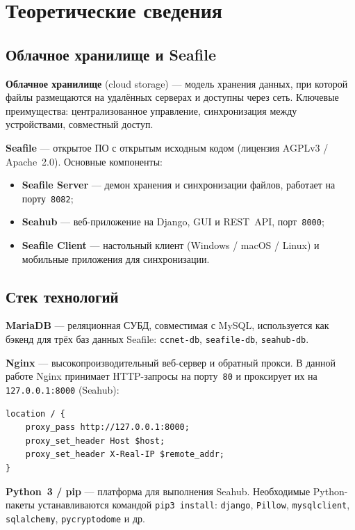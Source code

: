 \chapter{Теоретические сведения}
\label{ch:theory}

\section{Облачное хранилище и Seafile}

\textbf{Облачное хранилище} (cloud storage) — модель хранения данных, при которой
файлы размещаются на удалённых серверах и доступны через сеть. Ключевые преимущества:
централизованное управление, синхронизация между устройствами, совместный доступ.

\textbf{Seafile} — открытое ПО с открытым исходным кодом (лицензия AGPLv3 / Apache~2.0).
Основные компоненты:
\begin{itemize}
  \item \textbf{Seafile Server} — демон хранения и синхронизации файлов, работает
        на порту~\texttt{8082};
  \item \textbf{Seahub} — веб-приложение на Django, GUI и REST~API, порт~\texttt{8000};
  \item \textbf{Seafile Client} — настольный клиент (Windows / macOS / Linux) и
        мобильные приложения для синхронизации.
\end{itemize}

\section{Стек технологий}

\textbf{MariaDB} — реляционная СУБД, совместимая с MySQL, используется как бэкенд
для трёх баз данных Seafile: \texttt{ccnet-db}, \texttt{seafile-db}, \texttt{seahub-db}.

\textbf{Nginx} — высокопроизводительный веб-сервер и обратный прокси.
В данной работе Nginx принимает HTTP-запросы на порту~\texttt{80}
и проксирует их на \texttt{127.0.0.1:8000} (Seahub):
\begin{lstlisting}
location / {
    proxy_pass http://127.0.0.1:8000;
    proxy_set_header Host $host;
    proxy_set_header X-Real-IP $remote_addr;
}
\end{lstlisting}

\textbf{Python~3 / pip} — платформа для выполнения Seahub. Необходимые
Python-пакеты устанавливаются командой \texttt{pip3 install}:
\texttt{django}, \texttt{Pillow}, \texttt{mysqlclient}, \texttt{sqlalchemy},
\texttt{pycryptodome} и др.

